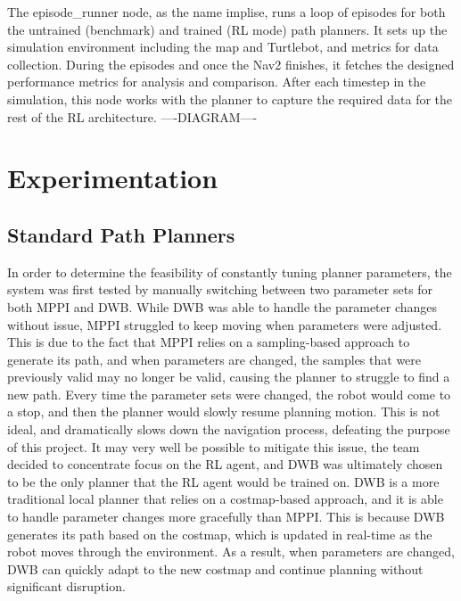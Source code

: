 \documentclass[conference]{IEEEtran}
\begin{document}
        The episode\_runner node, as the name implise, runs a loop of episodes for both the untrained (benchmark) and trained (RL mode) path planners. It sets
        up the simulation environment including the map and Turtlebot, and metrics for data collection. During the episodes and once the Nav2 finishes,
        it fetches the designed performance metrics for analysis and comparison. After each timestep in the simulation, this node works with the planner
        to capture the required data for the rest of the RL architecture.
        ----DIAGRAM----

\section{Experimentation}
    \subsection{Standard Path Planners}
    In order to determine the feasibility of constantly tuning planner parameters, the system was first tested by manually switching between two parameter sets for 
    both MPPI and DWB. While DWB was able to handle the parameter changes without issue, MPPI struggled to keep moving when parameters were adjusted. This is due 
    to the fact that MPPI relies on a sampling-based approach to generate its path, and when parameters are changed, the samples that were previously valid may no longer be valid, 
    causing the planner to struggle to find a new path. Every time the parameter sets were changed, the robot would come to a stop, and then the planner would 
    slowly resume planning motion. This is not ideal, and dramatically slows down the navigation process, defeating the purpose of this project. It may very well be possible to 
    mitigate this issue, the team decided to concentrate focus on the RL agent, and DWB was ultimately chosen to be the only planner that the RL agent would be trained on. 
    DWB is a more traditional local planner that relies on a costmap-based approach, and it is able to handle parameter changes more gracefully than MPPI. 
    This is because DWB generates its path based on the costmap, which is updated in real-time as the robot moves through the environment. 
    As a result, when parameters are changed, DWB can quickly adapt to the new costmap and continue planning without significant disruption.
    
\end{document}
